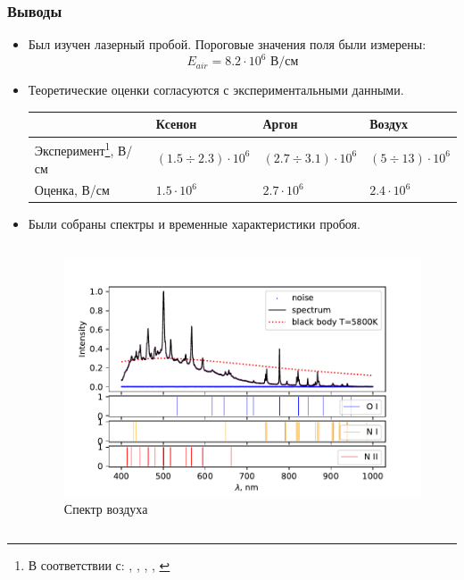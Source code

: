 \documentclass{beamer}
\begin{document}
	\begin{frame}
		\frametitle{Выводы}
		\begin{itemize}
			\item Был изучен лазерный пробой. Пороговые значения поля были измерены:
			$$ E_{air} = 8.2 \cdot 10^6 \text{ В/см}$$
			\item Теоретические оценки согласуются с экспериментальными данными.
			\footnotesize
			\begin{table}[]
				\begin{tabular}{llll}
					\hline
					& Ксенон            & Аргон            & Воздух              \\ \hline
					Эксперимент\footnote{В соответствии с: \cite{raizer}, \cite{argon_threshold}, \cite{xenon_threshold}, \cite{air_breakdown}, \cite{air_threshold}}, В/см & $(1.5 \div 2.3) \cdot 10^6$ & $(2.7 \div 3.1) \cdot 10^6$ & $(5 \div 13) \cdot 10^6$ \\
					Оценка, В/см & $1.5 \cdot 10^6$ & $2.7 \cdot 10^6$ & $2.4 \cdot 10^6$ \\ \hline
				\end{tabular}
			\end{table}
			
			\item 
			\normalsize Были собраны спектры и временные характеристики пробоя.
			\begin{columns}
				\begin{figure}
					\centering
					\includegraphics[width=\linewidth]{gen/air_lines.pdf}
					\caption*{Спектр воздуха}
				\end{figure}
				

\end{columns}
\end{itemize}
\end{frame}
\end{document}
